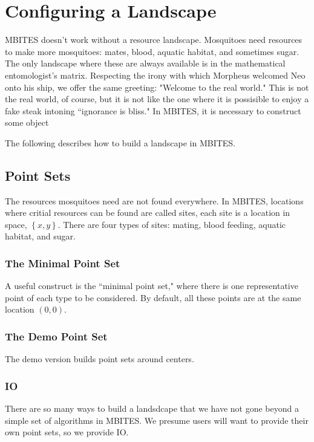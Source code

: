 \documentclass{article}
\begin{document}
\section{Configuring a Landscape} 

MBITES doesn't work without a resource landscape. Mosquitoes need resources to make more mosquitoes: mates, blood, aquatic habitat, and sometimes sugar. The only landscape where these are always available is in the mathematical entomologist's matrix. Respecting the irony with which Morpheus welcomed Neo onto his ship, we offer the same greeting: "Welcome to the real world." This is not the real world, of course, but it is not like the one where it is possisible to enjoy a fake steak intoning ``ignorance is bliss." In MBITES, it is necessary to construct some object 

The following describes how to build a landscape in MBITES. 

\subsection{Point Sets}

The resources mosquitoes need are not found everywhere.  In MBITES, locations where critial resources can be found are called sites, each site is a location in space, $\left\{ x,y \right\}$. There are four types of sites: mating, blood feeding, aquatic habitat, and sugar.

\subsubsection{The Minimal Point Set}

A useful construct is the ``minimal point set," where there is one representative point of each type to be considered. By default, all these points are at the same location $(0,0)$. 

\subsubsection{The Demo Point Set}

The demo version builds point sets around centers. 

\subsubsection{IO}

There are so many ways to build a landsdcape that we have not gone beyond a simple set of algorithms in MBITES. We presume users will want to provide their own point sets, so we provide IO. 
\end{document}
